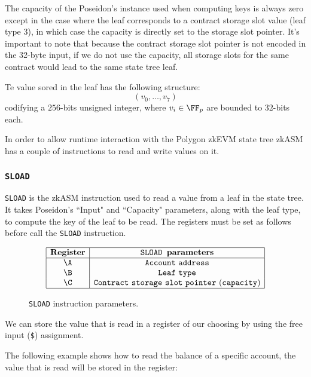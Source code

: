 The capacity of the Poseidon's instance used when computing keys is always zero except in the case where the leaf corresponds to a contract storage slot value (leaf type 3), in which case the capacity is directly set to the storage slot pointer. It's important to note that because the contract storage slot pointer is not encoded in the 32-byte input, if we do not use the capacity, all storage slots for the same contract would lead to the same state tree leaf.

Te value sored in the leaf has the following structure:
\[
(v_0, \dots, v_7)
\]
codifying a $256$-bits unsigned integer, where $v_i \in \FF_p$ are bounded to $32$-bits each. 

In order to allow runtime interaction with the Polygon zkEVM state tree zkASM has a couple of instructions to read and write values on it.

\subsubsection{\texttt{SLOAD}}

\texttt{SLOAD} is the zkASM instruction used to read a value from a leaf in the state tree. It takes Poseidon's ``Input" and ``Capacity" parameters, along with the leaf type, to compute the key of the leaf to be read. The registers must be set as follows before call the \texttt{SLOAD} instruction.

\begin{figure}[h!]
    \renewcommand{\figurename}{Table}
    \[
    \begin{array}{|c|c|}
        \hline
        \mathbf{Register} &\texttt{SLOAD } \textbf{parameters} \\ \hline
        \A & \mathtt{Account~address} \\
        \B & \mathtt{Leaf~type} \\
        \C & \mathtt{Contract~storage~slot~pointer~(capacity)} \\
        \hline
    \end{array}
    \]
    \caption{\texttt{SLOAD} instruction parameters.}
    \label{tab:memory-first-example}
\end{figure}

We can store the value that is read in a register of our choosing by using the free input (\texttt{\$}) assignment.

The following example shows how to read the balance of a specific account, the value that is read will be stored in the \E register:

